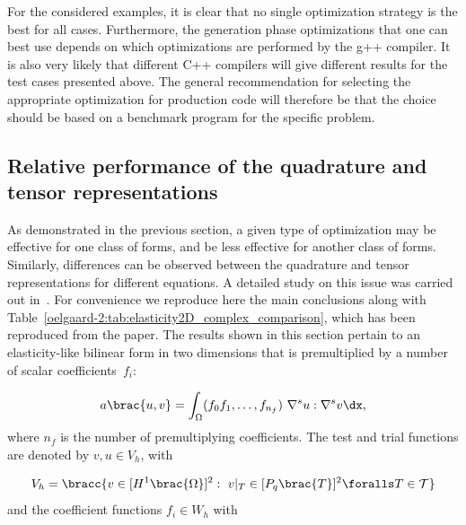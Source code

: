 For the considered examples, it is clear that no single optimization
strategy is the best for all cases.  Furthermore, the generation phase
optimizations that one can best use depends on which optimizations are
performed by the g++ compiler.  It is also very likely that different
C++ compilers will give different results for the test cases presented
above.  The general recommendation for selecting the appropriate
optimization for production code will therefore be that the choice
should be based on a benchmark program for the specific problem.

\subsection{Relative performance of the quadrature and tensor
  representations}
\label{oelgaard-2:sec:performance_of_representations}

As demonstrated in the previous section, a given type of optimization
may be effective for one class of forms, and be less effective for
another class of forms.  Similarly, differences can be observed
between the quadrature and tensor representations for different
equations.  A detailed study on this issue was carried out
in~\citet{OelgaardWells2010}.  For convenience we reproduce here the
main conclusions along with
Table~\ref{oelgaard-2:tab:elasticity2D_complex_comparison}, which has
been reproduced from the paper.  The results shown in this section
pertain to an elasticity-like bilinear form in two dimensions that is
premultiplied by a number of scalar coefficients~$f_{i}$:

\begin{equation}
  a\brac{u, v} = \int_{\Omega} (f_0 f_1, \ldots, f_{n_f} )\ \nabla^s u
  : \nabla^s v \dx,
  \label{oelgaard-2:eq:elasticity_form}
\end{equation}
%
where $n_f$ is the number of premultiplying coefficients.
The test and trial functions are denoted by $v, u \in V_{h}$, with

\begin{equation}
  V_{h} = \bracc{v \in [H^{1}\brac{\Omega}]^2: \ v\vert_T \in
    [P_{q}\brac{T}]^2 \foralls T \in \mathcal{T}}
 \label{oelgaard-2:eq:elastictity_H1_vector_space}
\end{equation}
%
and the coefficient functions $f_{i} \in W_{h}$ with

